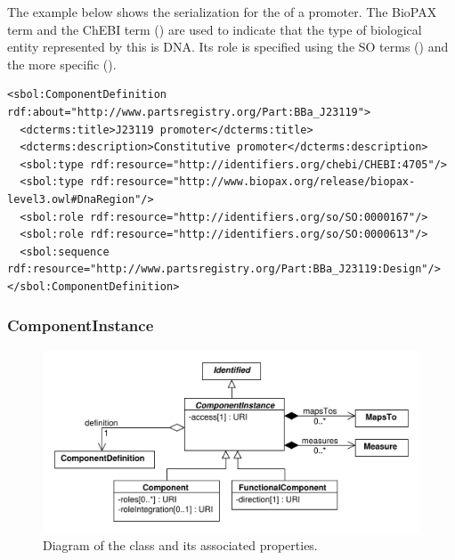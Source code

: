 The example below shows the serialization for the  of a promoter. The BioPAX term  and the ChEBI term  () are used to indicate that the type of biological entity represented by this  is DNA. Its role is specified using the SO terms  () and the more specific  ().

\begin{lstlisting}
<sbol:ComponentDefinition rdf:about="http://www.partsregistry.org/Part:BBa_J23119">
  <dcterms:title>J23119 promoter</dcterms:title>
  <dcterms:description>Constitutive promoter</dcterms:description>
  <sbol:type rdf:resource="http://identifiers.org/chebi/CHEBI:4705"/>
  <sbol:type rdf:resource="http://www.biopax.org/release/biopax-level3.owl#DnaRegion"/>
  <sbol:role rdf:resource="http://identifiers.org/so/SO:0000167"/>
  <sbol:role rdf:resource="http://identifiers.org/so/SO:0000613"/>
  <sbol:sequence rdf:resource="http://www.partsregistry.org/Part:BBa_J23119:Design"/>
</sbol:ComponentDefinition>
\end{lstlisting}


\subsubsection{ComponentInstance}
\label{sec:ComponentInstance}

\begin{figure}[ht]
\begin{center}
\includegraphics[scale=0.6]{uml/component_instance}
\caption[]{Diagram of the  class and its associated properties.}
\label{uml:component}
\end{center}
\end{figure}

